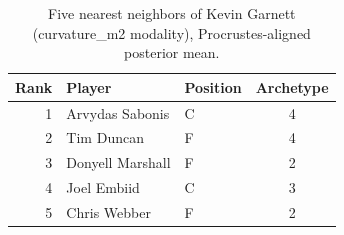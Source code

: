 \begin{table}[htbp]
  \centering\small
  \begin{tabular}{rllc}
    \toprule
    Rank & Player & Position & Archetype \\
    \midrule
    1 & Arvydas Sabonis & C & 4 \\
    2 & Tim Duncan & F & 4 \\
    3 & Donyell Marshall & F & 2 \\
    4 & Joel Embiid & C & 3 \\
    5 & Chris Webber & F & 2 \\
    \bottomrule
  \end{tabular}
  \caption{Five nearest neighbors of Kevin Garnett (curvature_m2 modality), Procrustes-aligned posterior mean.}
  \label{tab:Kevin_Garnett_neighbors_curvature_m2}
\end{table}

